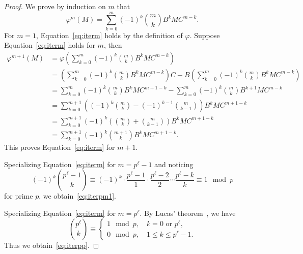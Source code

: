 \documentclass[letterpaper, 11pt, thm-restate]{article}
\numberwithin{equation}{section}
\theoremstyle{definition}
\theoremstyle{definition}
\theoremstyle{definition}
\begin{document}
\begin{proof}
    We prove by induction on $m$ that
    \begin{equation}\label{eq:iterm}
    \varphi^{m}(M) = \sum_{k=0}^{m} (-1)^{k} \binom{m}{k} B^k M C^{m-k}.
    \end{equation}
    For $m = 1$, Equation~\eqref{eq:iterm} holds by the definition of $\varphi$.
    Suppose Equation~\eqref{eq:iterm} holds for $m$, then
    \begin{align*}
        \varphi^{m+1}(M) & = \varphi\left(\sum_{k=0}^{m} (-1)^{k} \binom{m}{k} B^k M C^{m-k}\right) \\
        & = \left(\sum_{k=0}^{m} (-1)^{k} \binom{m}{k} B^k M C^{m-k}\right) C - B \left(\sum_{k=0}^{m} (-1)^{k} \binom{m}{k} B^k M C^{m-k}\right) \\
        & = \sum_{k=0}^{m} (-1)^{k} \binom{m}{k} B^k M C^{m+1-k} - \sum_{k=0}^{m} (-1)^{k} \binom{m}{k} B^{k+1} M C^{m-k} \\
        & = \sum_{k=0}^{m+1} \left((-1)^{k} \binom{m}{k} - (-1)^{k-1} \binom{m}{k-1}\right) B^k M C^{m+1-k} \\
        & = \sum_{k=0}^{m+1} (-1)^{k} \left(\binom{m}{k} + \binom{m}{k-1}\right) B^k M C^{m+1-k} \\
        & = \sum_{k=0}^{m+1} (-1)^{k} \binom{m+1}{k} B^k M C^{m+1-k}.
    \end{align*}
    This proves Equation~\eqref{eq:iterm} for $m+1$.

    Specializing Equation~\eqref{eq:iterm} for $m = p^{\ell}-1$ and noticing 
    \[
    (-1)^{k} \binom{p^{\ell}-1}{k} \equiv (-1)^{k} \cdot \frac{p^{\ell}-1}{1} \cdot \frac{p^{\ell}-2}{2} \cdots \frac{p^{\ell}-k}{k} \equiv 1 \mod p
    \]
    for prime $p$, we obtain~\eqref{eq:iterpm1}.

    Specializing Equation~\eqref{eq:iterm} for $m = p^{\ell}$.
    By Lucas' theorem~\cite{granville1997arithmetic}, we have
    \[
    \binom{p^{\ell}}{k} \equiv 
    \begin{cases}
        1 \mod p, \quad k = 0 \text{ or } p^{\ell}, \\
        0 \mod p, \quad 1 \leq k \leq p^{\ell}-1.
    \end{cases}
    \]
    Thus we obtain~\eqref{eq:iterpp}.
\end{proof}
\end{document}
